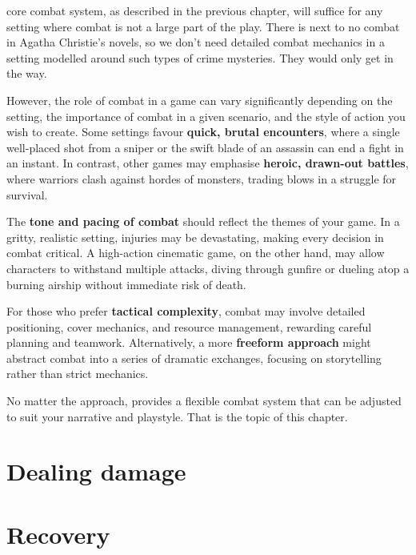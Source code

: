 


 core combat system, as described in the previous chapter, will suffice for any setting where combat is not a large part of the play. There is next to no combat in Agatha Christie's novels, so we don't need detailed combat mechanics in a setting modelled around such types of crime mysteries. They would only get in the way.

However, the role of combat in a game can vary significantly depending on the setting, the importance of combat in a given scenario, and the style of action you wish to create. Some settings favour \textbf{quick, brutal encounters}, where a single well-placed shot from a sniper or the swift blade of an assassin can end a fight in an instant. In contrast, other games may emphasise \textbf{heroic, drawn-out battles}, where warriors clash against hordes of monsters, trading blows in a struggle for survival.

The \textbf{tone and pacing of combat} should reflect the themes of your game. In a gritty, realistic setting, injuries may be devastating, making every decision in combat critical. A high-action cinematic game, on the other hand, may allow characters to withstand multiple attacks, diving through gunfire or dueling atop a burning airship without immediate risk of death.

For those who prefer \textbf{tactical complexity}, combat may involve detailed positioning, cover mechanics, and resource management, rewarding careful planning and teamwork. Alternatively, a more \textbf{freeform approach} might abstract combat into a series of dramatic exchanges, focusing on storytelling rather than strict mechanics.

No matter the approach, \wyrd provides a flexible combat system that can be adjusted to suit your narrative and playstyle. That is the topic of this chapter.


\section{Dealing damage}
\section{Recovery}



